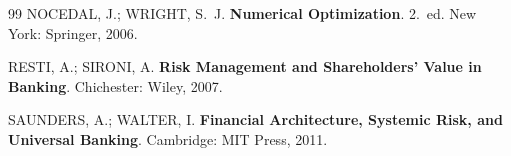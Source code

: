 \documentclass[12pt, a4paper, oneside]{article}
\begin{document}
\begin{thebibliography}{99}
  NOCEDAL, J.; WRIGHT, S.~J.
  \textbf{Numerical Optimization}.
  2.~ed. New York: Springer, 2006.

  RESTI, A.; SIRONI, A.
  \textbf{Risk Management and Shareholders' Value in Banking}.
  Chichester: Wiley, 2007.

  SAUNDERS, A.; WALTER, I.
  \textbf{Financial Architecture, Systemic Risk, and Universal Banking}.
  Cambridge: MIT Press, 2011.

\end{thebibliography}
\end{document}
